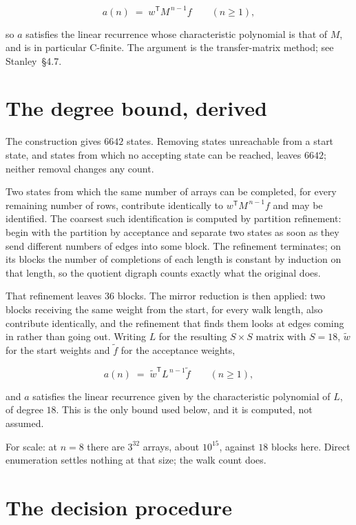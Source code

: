 \documentclass[11pt]{article}
\theoremstyle{definition}
\begin{document}
\[a(n) \;=\; w^{\mathsf T} M^{\,n-1} f \qquad (n \ge 1),\]

so $a$ satisfies the linear recurrence whose characteristic polynomial is that of $M$, and is in particular C-finite. The argument is the transfer-matrix method; see Stanley~\S4.7.

\section{The degree bound, derived}

The construction gives $6642$ states. Removing states unreachable from a start state, and states from which no accepting state can be reached, leaves $6642$; neither removal changes any count.

Two states from which the same number of arrays can be completed, for every remaining number of rows, contribute identically to $w^{\mathsf T}M^{\,n-1}f$ and may be identified. The coarsest such identification is computed by partition refinement: begin with the partition by acceptance and separate two states as soon as they send different numbers of edges into some block. The refinement terminates; on its blocks the number of completions of each length is constant by induction on that length, so the quotient digraph counts exactly what the original does.

That refinement leaves $36$ blocks. The mirror reduction is then applied: two blocks receiving the same weight from the start, for every walk length, also contribute identically, and the refinement that finds them looks at edges coming in rather than going out. Writing $L$ for the resulting $S \times S$ matrix with $S = 18$, $\tilde w$ for the start weights and $\tilde f$ for the acceptance weights,

\[a(n) \;=\; \tilde w^{\mathsf T} L^{\,n-1} \tilde f \qquad (n \ge 1),\]

and $a$ satisfies the linear recurrence given by the characteristic polynomial of $L$, of degree $18$. This is the only bound used below, and it is computed, not assumed.

For scale: at $n = 8$ there are $3^{32}$ arrays, about $10^{15}$, against $18$ blocks here. Direct enumeration settles nothing at that size; the walk count does.

\section{The decision procedure}
\end{document}
